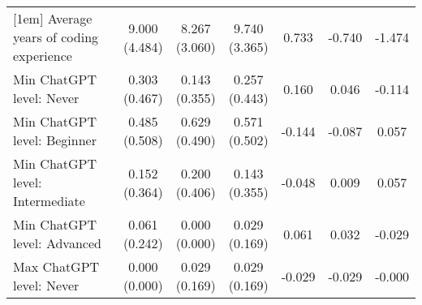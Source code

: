\begin{table}[ht]
{\begin{tabular}{lcccccc}
[1em]
Average years of coding experience & \shortstack{9.000\\(4.484)} & \shortstack{8.267\\(3.060)} & \shortstack{9.740\\(3.365)} & \shortstack{0.733\\\relax[0.431]} & \shortstack{-0.740\\\relax[0.442]} & \shortstack{-1.474\\\relax[0.059]}\\
[1em]
Min ChatGPT level: Never & \shortstack{0.303\\(0.467)} & \shortstack{0.143\\(0.355)} & \shortstack{0.257\\(0.443)} & \shortstack{0.160\\\relax[0.115]} & \shortstack{0.046\\\relax[0.679]} & \shortstack{-0.114\\\relax[0.238]}\\
[1em]
Min ChatGPT level: Beginner & \shortstack{0.485\\(0.508)} & \shortstack{0.629\\(0.490)} & \shortstack{0.571\\(0.502)} & \shortstack{-0.144\\\relax[0.239]} & \shortstack{-0.087\\\relax[0.482]} & \shortstack{0.057\\\relax[0.632]}\\
[1em]
Min ChatGPT level: Intermediate & \shortstack{0.152\\(0.364)} & \shortstack{0.200\\(0.406)} & \shortstack{0.143\\(0.355)} & \shortstack{-0.048\\\relax[0.607]} & \shortstack{0.009\\\relax[0.921]} & \shortstack{0.057\\\relax[0.533]}\\
[1em]
Min ChatGPT level: Advanced & \shortstack{0.061\\(0.242)} & \shortstack{0.000\\(0.000)} & \shortstack{0.029\\(0.169)} & \shortstack{0.061\\\relax[0.144]} & \shortstack{0.032\\\relax[0.527]} & \shortstack{-0.029\\\relax[0.321]}\\
[1em]
Max ChatGPT level: Never & \shortstack{0.000\\(0.000)} & \shortstack{0.029\\(0.169)} & \shortstack{0.029\\(0.169)} & \shortstack{-0.029\\\relax[0.335]} & \shortstack{-0.029\\\relax[0.335]} & \shortstack{-0.000\\\relax[1.000]}\\

\end{tabular}}
\end{table}
